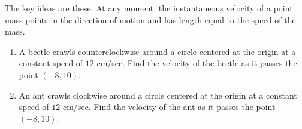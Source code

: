 \documentclass{ximera}
\begin{document}
The key ideas are these. At any moment, the instantaneous velocity of a point mass points in the direction of motion and has length equal to the speed of the mass.  

\begin{question} \label{Qdf3er3rbnnn}
\begin{enumerate}
\item A beetle crawls counterclockwise around a circle centered at the origin at a constant speed of $12$ cm/sec. Find the velocity of the beetle as it passes the point $(-8,10)$.

\item An ant crawls clockwise around a circle centered at the origin at a constant speed of $12$ cm/sec. Find the velocity of the ant as it passes the point $(-8,10)$.
\end{enumerate}
\end{question}
\end{document}
